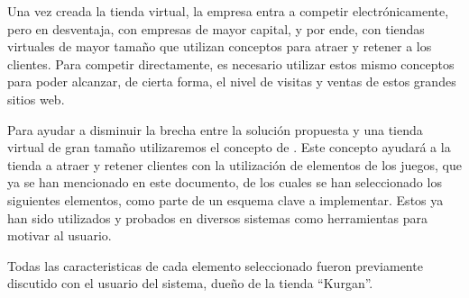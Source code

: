 Una vez creada la tienda virtual, la empresa entra a competir electrónicamente,
pero en desventaja, con empresas de mayor capital, y por ende, con tiendas virtuales
de mayor tamaño que utilizan conceptos para atraer y retener a los clientes.
Para competir directamente, es necesario utilizar estos mismo conceptos para
poder alcanzar, de cierta forma, el nivel de visitas y ventas de estos grandes
sitios web.

Para ayudar a disminuir la brecha entre la solución propuesta y una tienda virtual
de gran tamaño utilizaremos el concepto de {\gam}.
Este concepto ayudará a la tienda a atraer y retener clientes con la utilización
de elementos de los juegos, que ya se han mencionado en este documento,
de los cuales se han seleccionado los siguientes elementos, como parte
de un esquema clave a implementar. Estos ya han sido utilizados y probados en diversos
sistemas como herramientas para motivar al usuario\cite{SocialMotivation}.

Todas las caracteristicas de cada elemento seleccionado fueron previamente discutido con el
usuario del sistema, dueño de la tienda ``Kurgan''. 

